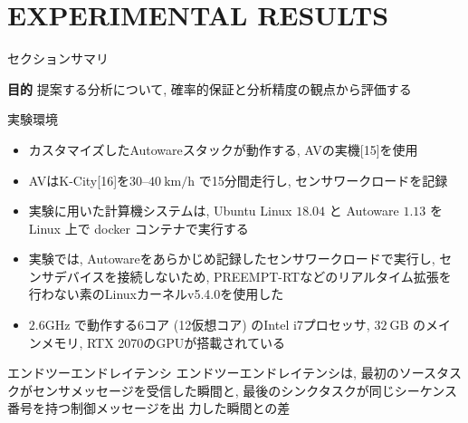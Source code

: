 
\section{EXPERIMENTAL RESULTS}
\label{sec: experimental results}

\begin{frame}{セクションサマリ}
    \begin{itembox}[l]{\textbf{目的}}
        提案する分析について, 確率的保証と分析精度の観点から評価する
    \end{itembox}
\end{frame}

\begin{frame}{実験環境}
    \begin{itemize}
        \item カスタマイズしたAutowareスタックが動作する, AVの実機[15]を使用
        \item AVはK-City[16]を30--$40 \mathrm{~km} / \mathrm{h}$ で15分間走行し, センサワークロードを記録
        \item 実験に用いた計算機システムは, Ubuntu Linux $18.04$ と Autoware $1.13$ を Linux 上で docker コンテナで実行する
        \item 実験では, Autowareをあらかじめ記録したセンサワークロードで実行し, センサデバイスを接続しないため, PREEMPT-RTなどのリアルタイム拡張を行わない素のLinuxカーネルv5.4.0を使用した
        \item $2.6 \mathrm{GHz}$ で動作する6コア (12仮想コア) のIntel i7プロセッサ, $32 \mathrm{~GB}$ のメインメモリ, RTX 2070のGPUが搭載されている
    \end{itemize}
\end{frame}

\begin{frame}{エンドツーエンドレイテンシ}
    エンドツーエンドレイテンシは, 最初のソースタスクがセンサメッセージを受信した瞬間と, 最後のシンクタスクが同じシーケンス番号を持つ制御メッセージを出 力した瞬間との差
\end{frame}


